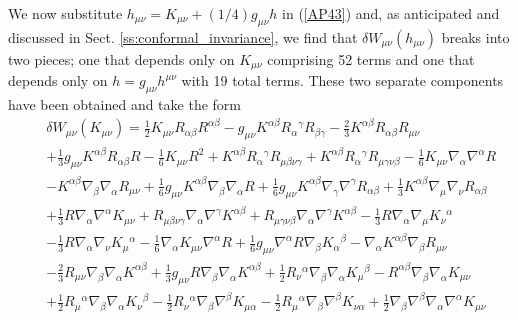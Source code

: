 We now substitute $h_{\mu\nu}=K_{\mu\nu}+(1/4)g_{\mu\nu}h$ in (\ref{AP43}) and, as anticipated and discussed in Sect. \ref{ss:conformal_invariance}, we find that $\delta W_{\mu\nu}(h_{\mu\nu})$ breaks into two pieces; one that depends only on $K_{\mu\nu}$ comprising 52 terms and one that depends only on $h=g_{\mu\nu}h^{\mu\nu}$ with 19 total terms. These two separate components have been obtained and take the form
%
\begin{eqnarray}
&&\delta W_{\mu\nu}(K_{\mu\nu})=\tfrac{1}{2} K_{\mu \nu} R_{\alpha \beta} R^{\alpha \beta} -  g_{\mu \nu} K^{\alpha \beta} R_{\alpha}{}^{\gamma} R_{\beta \gamma} -  \tfrac{2}{3} K^{\alpha \beta} R_{\alpha \beta} R_{\mu \nu} 
\nonumber\\
&&+ \tfrac{1}{3} g_{\mu \nu} K^{\alpha \beta} R_{\alpha \beta} R -  \tfrac{1}{6} K_{\mu \nu} R^2 
+ K^{\alpha \beta} R_{\alpha}{}^{\gamma} R_{\mu \beta \nu \gamma} 
+ K^{\alpha \beta} R_{\alpha}{}^{\gamma} R_{\mu \gamma \nu \beta} -  \tfrac{1}{6} K_{\mu \nu} \nabla_{\alpha}\nabla^{\alpha}R 
\nonumber\\
&&-  K^{\alpha \beta} \nabla_{\beta}\nabla_{\alpha}R_{\mu \nu} + \tfrac{1}{6} g_{\mu \nu} K^{\alpha \beta} \nabla_{\beta}\nabla_{\alpha}R + \tfrac{1}{6} g_{\mu \nu} K^{\alpha \beta} \nabla_{\gamma}\nabla^{\gamma}R_{\alpha \beta} 
+ \tfrac{1}{3} K^{\alpha \beta} \nabla_{\mu}\nabla_{\nu}R_{\alpha \beta}
\nonumber\\
&&
+\tfrac{1}{3} R \nabla_{\alpha}\nabla^{\alpha}K_{\mu \nu} + R_{\mu \beta \nu \gamma} \nabla_{\alpha}\nabla^{\gamma}K^{\alpha \beta} + R_{\mu \gamma \nu \beta} \nabla_{\alpha}\nabla^{\gamma}K^{\alpha \beta} -  \tfrac{1}{3} R \nabla_{\alpha}\nabla_{\mu}K_{\nu}{}^{\alpha} 
\nonumber\\
&&-  \tfrac{1}{3} R \nabla_{\alpha}\nabla_{\nu}K_{\mu}{}^{\alpha} 
-  \tfrac{1}{6} \nabla_{\alpha}K_{\mu \nu} \nabla^{\alpha}R 
+ \tfrac{1}{6} g_{\mu \nu} \nabla^{\alpha}R \nabla_{\beta}K_{\alpha}{}^{\beta} -  \nabla_{\alpha}K^{\alpha \beta} \nabla_{\beta}R_{\mu \nu} 
\nonumber\\
&&-  \tfrac{2}{3} R_{\mu \nu} \nabla_{\beta}\nabla_{\alpha}K^{\alpha \beta} + \tfrac{1}{3} g_{\mu \nu} R \nabla_{\beta}\nabla_{\alpha}K^{\alpha \beta} + \tfrac{1}{2} R_{\nu}{}^{\alpha} \nabla_{\beta}\nabla_{\alpha}K_{\mu}{}^{\beta} 
-  R^{\alpha \beta} \nabla_{\beta}\nabla_{\alpha}K_{\mu \nu} 
\nonumber\\
&&
+ \tfrac{1}{2} R_{\mu}{}^{\alpha} \nabla_{\beta}\nabla_{\alpha}K_{\nu}{}^{\beta} -  \tfrac{1}{2} R_{\nu}{}^{\alpha} \nabla_{\beta}\nabla^{\beta}K_{\mu \alpha} -  \tfrac{1}{2} R_{\mu}{}^{\alpha} \nabla_{\beta}\nabla^{\beta}K_{\nu \alpha} + \tfrac{1}{2} \nabla_{\beta}\nabla^{\beta}\nabla_{\alpha}\nabla^{\alpha}K_{\mu \nu} 

\end{eqnarray}
